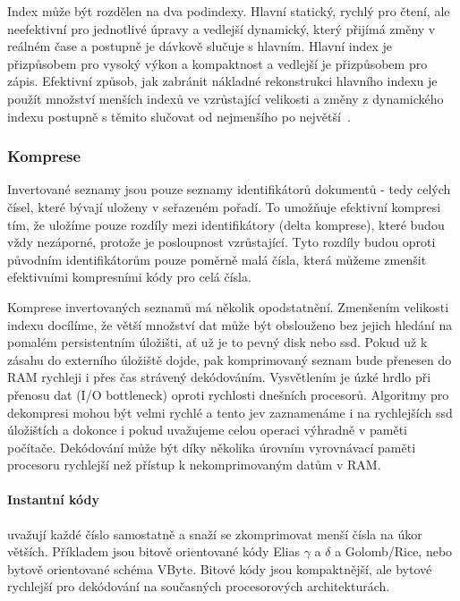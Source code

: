 \documentclass[11pt,letterpaper,oneside,openright]{book}
\begin{document}
Index může být rozdělen na dva podindexy. Hlavní statický, rychlý pro čtení,
ale neefektivní pro jednotlivé úpravy a vedlejší dynamický, který přijímá změny
v reálném čase a postupně je dávkově slučuje s hlavním. Hlavní index je
přizpůsobem pro vysoký výkon a kompaktnost a vedlejší je přizpůsobem pro zápis.
Efektivní způsob, jak zabránit nákladné rekonstrukci hlavního indexu je použít
množství menších indexů ve vzrůstající velikosti a změny z dynamického indexu
postupně s těmito slučovat od nejmenšího po
největší~\citep[kap.~4]{Manning:2008:IIR:1394399}.

\subsubsection{Komprese} \label{sec:compression}
Invertované seznamy jsou pouze seznamy identifikátorů dokumentů - tedy celých
čísel, které bývají uloženy v seřazeném pořadí. To umožňuje efektivní kompresi
tím, že uložíme pouze rozdíly mezi identifikátory (delta komprese), které budou
vždy nezáporné, protože je posloupnost vzrůstající. Tyto rozdíly budou oproti
původním identifikátorům pouze poměrně malá čísla, která můžeme zmenšit
efektivními kompresními kódy pro celá čísla.

Komprese invertovaných seznamů má několik opodstatnění. Zmenšením velikosti
indexu docílíme, že větší množství dat může být obslouženo bez jejich hledání
na pomalém persistentním úložišti, ať už je to pevný disk nebo ssd. Pokud už k
zásahu do externího úložiště dojde, pak komprimovaný seznam bude přenesen do
RAM rychleji i přes čas strávený dekódováním. Vysvětlením je úzké hrdlo při
přenosu dat (I/O bottleneck) oproti rychlosti dnešních procesorů. Algoritmy pro
dekompresi mohou být velmi rychlé a tento jev zaznamenáme i na rychlejších ssd
úložištích a dokonce i pokud uvažujeme celou operaci výhradně v paměti
počítače. Dekódování může být díky několika úrovním vyrovnávací paměti
procesoru rychlejší než přístup k nekomprimovaným datům v RAM.

\paragraph{Instantní kódy} uvažují každé číslo samostatně a snaží se
zkomprimovat menší čísla na úkor větších. Příkladem jsou bitově orientované
kódy Elias $\gamma$ a $\delta$ a Golomb/Rice, nebo bytově orientované schéma
VByte. Bitové kódy jsou kompaktnější, ale bytové rychlejší pro dekódování na
současných procesorových architekturách.
\end{document}
